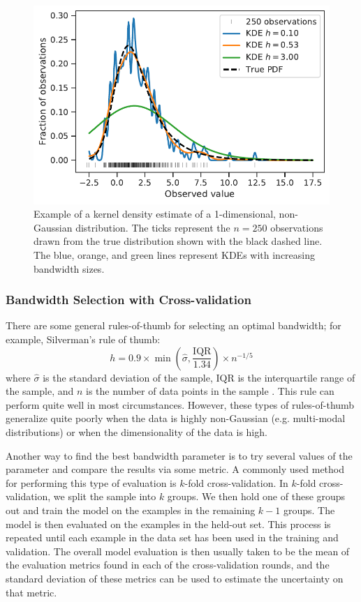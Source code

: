 \begin{figure}
    \centering
    \includegraphics{figures/snemo_kde/1d_hist_example.pdf}
    \caption{Example of a kernel density estimate of a 1-dimensional, non-Gaussian distribution. The ticks represent the $n=250$ observations drawn from the true distribution shown with the black dashed line. The blue, orange, and green lines represent KDEs with increasing bandwidth sizes.}
    \label{fig:1d_hist}
\end{figure}

\subsubsection{Bandwidth Selection with Cross-validation}
There are some general rules-of-thumb for selecting an optimal bandwidth; for example, Silverman's rule of thumb:
$$h= 0.9\times\min\left(\hat{\sigma}, \frac{\textrm{IQR}}{1.34}\right) \times n^{-1/5}$$
where $\hat{\sigma}$ is the standard deviation of the sample, $\textrm{IQR}$ is the interquartile range of the sample, and $n$ is the number of data points in the sample \parencite{Silverman1986}. This rule can perform quite well in most circumstances. However, these types of rules-of-thumb generalize quite poorly when the data is highly non-Gaussian (e.g. multi-modal distributions) or when the dimensionality of the data is high.

Another way to find the best bandwidth parameter is to try several values of the parameter and compare the results via some metric. A commonly used method for performing this type of evaluation is $k$-fold cross-validation. In $k$-fold cross-validation, we split the sample into $k$ groups. We then hold one of these groups out and train the model on the examples in the remaining $k-1$ groups. The model is then evaluated on the examples in the held-out set. This process is repeated until each example in the data set has been used in the training and validation. The overall model evaluation is then usually taken to be the mean of the evaluation metrics found in each of the cross-validation rounds, and the standard deviation of these metrics can be used to estimate the uncertainty on that metric.

